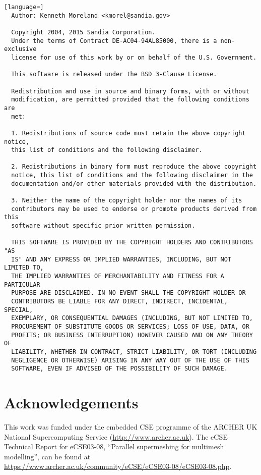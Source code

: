\documentclass{article}
\begin{document}
\begin{lstlisting}[language=] 
  Author: Kenneth Moreland <kmorel@sandia.gov>

  Copyright 2004, 2015 Sandia Corporation.
  Under the terms of Contract DE-AC04-94AL85000, there is a non-exclusive
  license for use of this work by or on behalf of the U.S. Government.
 
  This software is released under the BSD 3-Clause License.
 
  Redistribution and use in source and binary forms, with or without
  modification, are permitted provided that the following conditions are
  met:
 
  1. Redistributions of source code must retain the above copyright notice,
  this list of conditions and the following disclaimer.
 
  2. Redistributions in binary form must reproduce the above copyright
  notice, this list of conditions and the following disclaimer in the
  documentation and/or other materials provided with the distribution.
 
  3. Neither the name of the copyright holder nor the names of its
  contributors may be used to endorse or promote products derived from this
  software without specific prior written permission.
 
  THIS SOFTWARE IS PROVIDED BY THE COPYRIGHT HOLDERS AND CONTRIBUTORS "AS
  IS" AND ANY EXPRESS OR IMPLIED WARRANTIES, INCLUDING, BUT NOT LIMITED TO,
  THE IMPLIED WARRANTIES OF MERCHANTABILITY AND FITNESS FOR A PARTICULAR
  PURPOSE ARE DISCLAIMED. IN NO EVENT SHALL THE COPYRIGHT HOLDER OR
  CONTRIBUTORS BE LIABLE FOR ANY DIRECT, INDIRECT, INCIDENTAL, SPECIAL,
  EXEMPLARY, OR CONSEQUENTIAL DAMAGES (INCLUDING, BUT NOT LIMITED TO,
  PROCUREMENT OF SUBSTITUTE GOODS OR SERVICES; LOSS OF USE, DATA, OR
  PROFITS; OR BUSINESS INTERRUPTION) HOWEVER CAUSED AND ON ANY THEORY OF
  LIABILITY, WHETHER IN CONTRACT, STRICT LIABILITY, OR TORT (INCLUDING
  NEGLIGENCE OR OTHERWISE) ARISING IN ANY WAY OUT OF THE USE OF THIS
  SOFTWARE, EVEN IF ADVISED OF THE POSSIBILITY OF SUCH DAMAGE.
\end{lstlisting}

\section{Acknowledgements}

This work was funded under the embedded CSE programme of the ARCHER UK National
Supercomputing Service (\url{http://www.archer.ac.uk}). The eCSE Technical
Report for eCSE03-08, ``Parallel supermeshing for multimesh modelling'', can be
found at \url{https://www.archer.ac.uk/community/eCSE/eCSE03-08/eCSE03-08.php}.
\end{document}
